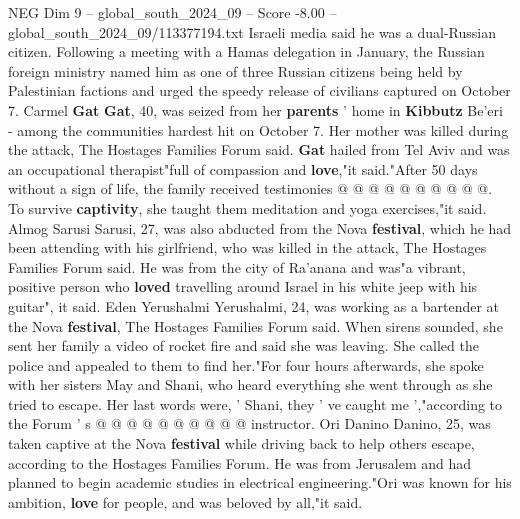 \begin{textsample}{NEG Dim 9 – global\_south\_2024\_09 – Score -8.00 – global\_south\_2024\_09/113377194.txt}
Israeli media said he was a dual-Russian citizen.
Following a meeting with a Hamas delegation in January, the Russian foreign ministry named him as one of three Russian citizens being held by Palestinian factions and urged the speedy release of civilians captured on October 7.
Carmel \textbf{Gat} \textbf{Gat}, 40, was seized from her \textbf{parents} ' home in \textbf{Kibbutz} Be'eri - among the communities hardest hit on October 7.
Her mother was killed during the attack, The Hostages Families Forum said. \textbf{Gat} hailed from Tel Aviv and was an occupational therapist"full of compassion and \textbf{love},"it said."After 50 days without a sign of life, the family received testimonies @ @ @ @ @ @ @ @ @ @.
To survive \textbf{captivity}, she taught them meditation and yoga exercises,"it said.
Almog Sarusi Sarusi, 27, was also abducted from the Nova \textbf{festival}, which he had been attending with his girlfriend, who was killed in the attack, The Hostages Families Forum said.
He was from the city of Ra'anana and was"a vibrant, positive person who \textbf{loved} travelling around Israel in his white jeep with his guitar", it said.
Eden Yerushalmi Yerushalmi, 24, was working as a bartender at the Nova \textbf{festival}, The Hostages Families Forum said.
When sirens sounded, she sent her family a video of rocket fire and said she was leaving.
She called the police and appealed to them to find her."For four hours afterwards, she spoke with her sisters May and Shani, who heard everything she went through as she tried to escape.
Her last words were, ' Shani, they ' ve caught me ',"according to the Forum ' s @ @ @ @ @ @ @ @ @ @ instructor.
Ori Danino Danino, 25, was taken captive at the Nova \textbf{festival} while driving back to help others escape, according to the Hostages Families Forum.
He was from Jerusalem and had planned to begin academic studies in electrical engineering."Ori was known for his ambition, \textbf{love} for people, and was beloved by all,"it said.

\end{textsample}
